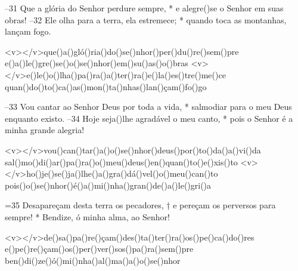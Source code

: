 –31 Que a glória do Senhor perdure sempre, *
e alegre()se o Senhor em suas obras!
–32 Ele olha para a terra, ela estremece; *
quando toca as montanhas, lançam fogo.

<v></v>que()a()gló()ria()do()se()nhor()per()du()re()sem()pre
e()a()le()gre()se()o()se()nhor()em()su()as()o()bras
<v></v>e()le()o()lha()pa()ra()a()ter()ra()e()la()es()tre()me()ce
quan()do()to()ca()as()mon()ta()nhas()lan()çam()fo()go

–33 Vou cantar ao Senhor Deus por toda a vida, *
salmodiar para o meu Deus enquanto existo.
–34 Hoje seja()lhe agradável o meu canto, *
pois o Senhor é a minha grande alegria!

<v></v>vou()can()tar()a()o()se()nhor()deus()por()to()da()a()vi()da
sal()mo()di()ar()pa()ra()o()meu()deus()en()quan()to()e()xis()to
<v></v>ho()je()se()ja()lhe()a()gra()dá()vel()o()meu()can()to
pois()o()se()nhor()é()a()mi()nha()gran()de()a()le()gri()a

=35 Desapareçam desta terra os pecadores, †
e pereçam os perversos para sempre! *
Bendize, ó minha alma, ao Senhor!

<v></v>de()sa()pa()re()çam()des()ta()ter()ra()os()pe()ca()do()res
e()pe()re()çam()os()per()ver()sos()pa()ra()sem()pre
ben()di()ze()ó()mi()nha()al()ma()a()o()se()nhor